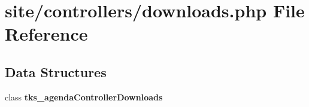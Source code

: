 \section{site/controllers/downloads.php File Reference}
\label{site_2controllers_2downloads_8php}
\subsection*{Data Structures}
\begin{DoxyCompactItemize}
\item 
class \textbf{ tks\+\_\+agenda\+Controller\+Downloads}
\end{DoxyCompactItemize}
